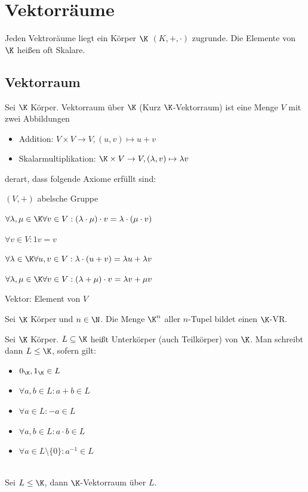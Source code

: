 \section{Vektorräume} 
\begin{definition}
	Jeden Vektroräume liegt ein Körper $\K$ $(K,+,\cdot)$ zugrunde. Die Elemente von $\K$ heißen oft Skalare.
\end{definition}
\subsection{Vektorraum}
\begin{definition}
	Sei $\K$ Körper. Vektorraum über $\K$ (Kurz $\K$-Vektorraum) ist eine Menge $V$ mit zwei Abbildungen
	\begin{itemize}
		\item Addition: $V\times V \to V, (u,v)\mapsto u+v$
		\item Skalarmultiplikation: $\K\times V \to V, (\lambda, v)\mapsto \lambda v$
	\end{itemize}
	derart, dass folgende Axiome erfüllt sind:
	\begin{enumerateroman}
		\item $(V,+)$ abelsche Gruppe
		\item $\forall \lambda, \mu \in \K \forall v\in V: (\lambda \cdot \mu)\cdot v = \lambda \cdot (\mu \cdot v)$
		\item $\forall v \in V:1v=v$
		\item $\forall \lambda \in \K \forall u,v \in V: \lambda \cdot (u+v) = \lambda u + \lambda v$
		\item $\forall \lambda, \mu \in \K \forall v \in V: (\lambda+\mu)\cdot v = \lambda v + \mu v$
	\end{enumerateroman}
	Vektor: Element von $V$
\end{definition}
\begin{example}[Vektorraum $\K^n$]
Sei $\K$ Körper und $n\in \N$. Die Menge $\K^n$ aller $n$-Tupel bildet einen $\K$-VR.	
\end{example}
\begin{example}
	Sei $\K$ Körper. $L\subseteq \K$ heißt Unterkörper (auch Teilkörper) von $\K$. Man schreibt dann $L \leq \K$, sofern gilt:
	\begin{itemize}
		\item $0_{\K}, 1_{\K} \in L$
		\item $\forall a,b \in L: a+b \in L$
		\item $\forall a \in L: -a\in L$
		\item $\forall a, b \in L: a\cdot b \in L$
		\item $\forall a\in L\setminus\{0\}: a^{-1}\in L$
	\end{itemize}
	\\
	Sei $L\leq \K$, dann $\K$-Vektorraum über $L$.
\end{example}
